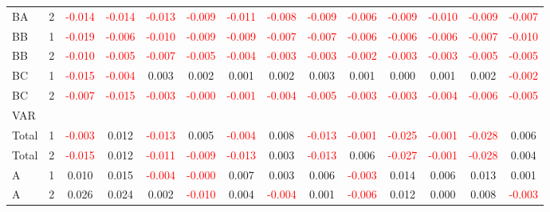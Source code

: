 \begin{table}[!htb]
{\begin{tabular}{llcccccccccccc}
BA & 2 & \textcolor{red}{-0.014} & \textcolor{red}{-0.014} & \textcolor{red}{-0.013} & \textcolor{red}{-0.009} & \textcolor{red}{-0.011} & \textcolor{red}{-0.008} & \textcolor{red}{-0.009} & \textcolor{red}{-0.006} & \textcolor{red}{-0.009} & \textcolor{red}{-0.010} & \textcolor{red}{-0.009} & \textcolor{red}{-0.007}\\
BB & 1 & \textcolor{red}{-0.019} & \textcolor{red}{-0.006} & \textcolor{red}{-0.010} & \textcolor{red}{-0.009} & \textcolor{red}{-0.009} & \textcolor{red}{-0.007} & \textcolor{red}{-0.007} & \textcolor{red}{-0.006} & \textcolor{red}{-0.006} & \textcolor{red}{-0.006} & \textcolor{red}{-0.007} & \textcolor{red}{-0.010}\\
BB & 2 & \textcolor{red}{-0.010} & \textcolor{red}{-0.005} & \textcolor{red}{-0.007} & \textcolor{red}{-0.005} & \textcolor{red}{-0.004} & \textcolor{red}{-0.003} & \textcolor{red}{-0.003} & \textcolor{red}{-0.002} & \textcolor{red}{-0.003} & \textcolor{red}{-0.003} & \textcolor{red}{-0.005} & \textcolor{red}{-0.005}\\
BC & 1 & \textcolor{red}{-0.015} & \textcolor{red}{-0.004} & 0.003 & 0.002 & 0.001 & 0.002 & 0.003 & 0.001 & 0.000 & 0.001 & 0.002 & \textcolor{red}{-0.002}\\
BC & 2 & \textcolor{red}{-0.007} & \textcolor{red}{-0.015} & \textcolor{red}{-0.003} & \textcolor{red}{-0.000} & \textcolor{red}{-0.001} & \textcolor{red}{-0.004} & \textcolor{red}{-0.005} & \textcolor{red}{-0.003} & \textcolor{red}{-0.003} & \textcolor{red}{-0.004} & \textcolor{red}{-0.006} & \textcolor{red}{-0.005}\\
\hline
VAR &  &  &  &  &  &  &  &  &  &  &  &  & \\
\hline
Total & 1 & \textcolor{red}{-0.003} & 0.012 & \textcolor{red}{-0.013} & 0.005 & \textcolor{red}{-0.004} & 0.008 & \textcolor{red}{-0.013} & \textcolor{red}{-0.001} & \textcolor{red}{-0.025} & \textcolor{red}{-0.001} & \textcolor{red}{-0.028} & 0.006\\
Total & 2 & \textcolor{red}{-0.015} & 0.012 & \textcolor{red}{-0.011} & \textcolor{red}{-0.009} & \textcolor{red}{-0.013} & 0.003 & \textcolor{red}{-0.013} & 0.006 & \textcolor{red}{-0.027} & \textcolor{red}{-0.001} & \textcolor{red}{-0.028} & 0.004\\
A & 1 & 0.010 & 0.015 & \textcolor{red}{-0.004} & \textcolor{red}{-0.000} & 0.007 & 0.003 & 0.006 & \textcolor{red}{-0.003} & 0.014 & 0.006 & 0.013 & 0.001\\
A & 2 & 0.026 & 0.024 & 0.002 & \textcolor{red}{-0.010} & 0.004 & \textcolor{red}{-0.004} & 0.001 & \textcolor{red}{-0.006} & 0.012 & 0.000 & 0.008 & \textcolor{red}{-0.003}\\

\end{tabular}}
\end{table}

